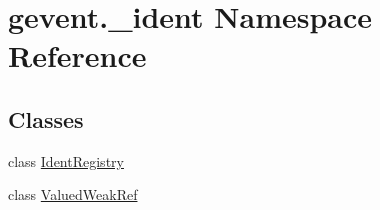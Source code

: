 \hypertarget{namespacegevent_1_1__ident}{}\section{gevent.\+\_\+ident Namespace Reference}
\label{namespacegevent_1_1__ident}
\subsection*{Classes}
\begin{DoxyCompactItemize}
\item 
class \hyperlink{classgevent_1_1__ident_1_1_ident_registry}{Ident\+Registry}
\item 
class \hyperlink{classgevent_1_1__ident_1_1_valued_weak_ref}{Valued\+Weak\+Ref}
\end{DoxyCompactItemize}
